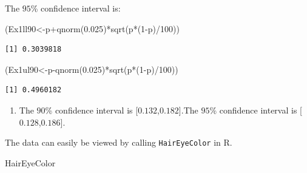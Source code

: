 \documentclass[
  letterpaper,
  DIV=11,
  numbers=noendperiod]{scrreprt}
\newenvironment{Shaded}{\begin{snugshade}}{\end{snugshade}}
\newcommand{\DecValTok}[1]{\textcolor[rgb]{0.68,0.00,0.00}{#1}}
\newcommand{\FloatTok}[1]{\textcolor[rgb]{0.68,0.00,0.00}{#1}}
\newcommand{\FunctionTok}[1]{\textcolor[rgb]{0.28,0.35,0.67}{#1}}
\newcommand{\NormalTok}[1]{\textcolor[rgb]{0.00,0.23,0.31}{#1}}
\newcommand{\OtherTok}[1]{\textcolor[rgb]{0.00,0.23,0.31}{#1}}
\newcommand{\SpecialCharTok}[1]{\textcolor[rgb]{0.37,0.37,0.37}{#1}}
\providecommand{\tightlist}{%
  \setlength{\itemsep}{0pt}\setlength{\parskip}{0pt}}\usepackage{longtable,booktabs,array}
\begin{document}
The \(95\)\% confidence interval is:

\begin{Shaded}
\begin{Highlighting}[numbers=left,,]
\NormalTok{(Ex1ll90}\OtherTok{\textless{}{-}}\NormalTok{p}\SpecialCharTok{+}\FunctionTok{qnorm}\NormalTok{(}\FloatTok{0.025}\NormalTok{)}\SpecialCharTok{*}\FunctionTok{sqrt}\NormalTok{(p}\SpecialCharTok{*}\NormalTok{(}\DecValTok{1}\SpecialCharTok{{-}}\NormalTok{p)}\SpecialCharTok{/}\DecValTok{100}\NormalTok{))}
\end{Highlighting}
\end{Shaded}

\begin{verbatim}
[1] 0.3039818
\end{verbatim}

\begin{Shaded}
\begin{Highlighting}[numbers=left,,]
\NormalTok{(Ex1ul90}\OtherTok{\textless{}{-}}\NormalTok{p}\SpecialCharTok{{-}}\FunctionTok{qnorm}\NormalTok{(}\FloatTok{0.025}\NormalTok{)}\SpecialCharTok{*}\FunctionTok{sqrt}\NormalTok{(p}\SpecialCharTok{*}\NormalTok{(}\DecValTok{1}\SpecialCharTok{{-}}\NormalTok{p)}\SpecialCharTok{/}\DecValTok{100}\NormalTok{))}
\end{Highlighting}
\end{Shaded}

\begin{verbatim}
[1] 0.4960182
\end{verbatim}

\begin{blackbox}

\begin{enumerate}
\def\labelenumi{\arabic{enumi}.}
\setcounter{enumi}{1}
\tightlist
\item
  The \(90\)\% confidence interval is {[}\(0.132\),\(0.182\){]}.The
  \(95\)\% confidence interval is {[}\(0.128\),\(0.186\){]}.
\end{enumerate}

\end{blackbox}

The data can easily be viewed by calling \texttt{HairEyeColor} in R.

\begin{Shaded}
\begin{Highlighting}[numbers=left,,]
\NormalTok{HairEyeColor}
\end{Highlighting}
\end{Shaded}
\end{document}
